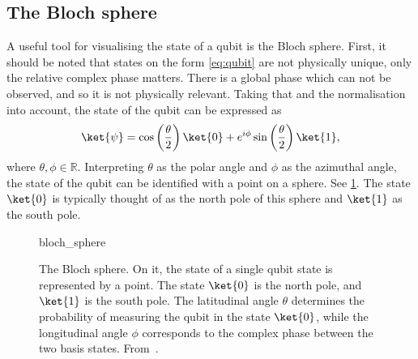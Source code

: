 \subsection{The Bloch sphere}
A useful tool for visualising the state of a qubit is the Bloch sphere.
First, it should be noted that states on the form \cref{eq:qubit} are not physically unique, only the relative complex phase matters.
There is a global phase which can not be observed, and so it is not physically relevant.
Taking that and the normalisation into account, the state of the qubit can be expressed as
\begin{equation}
  \ket{\psi} = \cos\left(\frac{\theta}{2}\right) \ket{0} + e^{i\phi} \sin\left(\frac{\theta}{2}\right) \ket{1},
  \label{eq:bloch}
\end{equation}
where $\theta, \phi \in \mathbb{R}$.
Interpreting $\theta$ as the polar angle and $\phi$ as the azimuthal angle, the state of the qubit can be identified with a point on a sphere.
See \cref{fig:bloch}.
The state $\ket{0}$ is typically thought of as the north pole of this sphere and $\ket{1}$ as the south pole.

\begin{figure}
  \centering
  \def\svgwidth{0.65\textwidth}
  {bloch_sphere}
  \caption[
    The Bloch sphere.
  ]
  {
    The Bloch sphere.
    On it, the state of a single qubit state is represented by a point.
    The state $\ket{0}$ is the north pole, and $\ket{1}$ is the south pole.
    The latitudinal angle $\theta$ determines the probability of measuring the qubit in the state $\ket{0}$, while the longitudinal angle $\phi$ corresponds to the complex phase between the two basis states.
    From~\autocite{wikipedia_bloch}.
  }
  \label{fig:bloch}
\end{figure}

